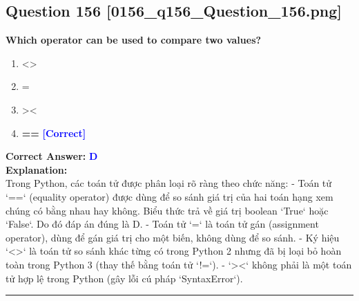 \documentclass[11pt,a4paper]{article}
\begin{document}
\begin{minipage}{\textwidth}
\subsection*{Question 156 \quad \footnotesize{[0156_q156_Question_156.png]}}
\noindent \textbf{Which operator can be used to compare two values?}

\begin{enumerate}[label=\Alph*.]
    \item <>
    \item =
    \item ><
    \item \textbf{==} \hfill \textcolor{blue}{\textbf{[Correct]}}
\end{enumerate}

\noindent \textbf{Correct Answer:} \textcolor{blue}{\textbf{D}} \\[4pt]
\noindent \textbf{Explanation:}\\
Trong Python, các toán tử được phân loại rõ ràng theo chức năng:\newline
- Toán tử `==` (equality operator) được dùng để so sánh giá trị của hai toán hạng xem chúng có bằng nhau hay không. Biểu thức trả về giá trị boolean `True` hoặc `False`. Do đó đáp án đúng là D.\newline
- Toán tử `=` là toán tử gán (assignment operator), dùng để gán giá trị cho một biến, không dùng để so sánh.\newline
- Ký hiệu `<>` là toán tử so sánh khác từng có trong Python 2 nhưng đã bị loại bỏ hoàn toàn trong Python 3 (thay thế bằng toán tử `!=`).\newline
- `><` không phải là một toán tử hợp lệ trong Python (gây lỗi cú pháp `SyntaxError`).
\end{minipage}
\vspace{0.8cm}
\hrule
\vspace{0.5cm}
\end{document}
